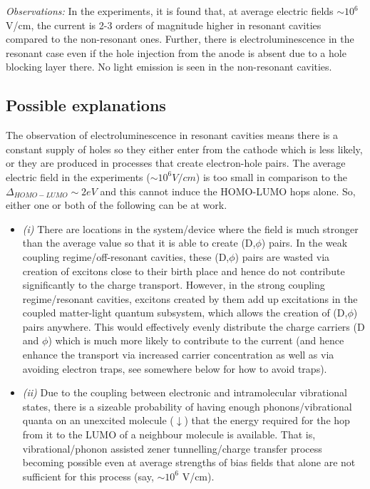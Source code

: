 \documentclass[a4paper,twocolumn]{revtex4-1} %
\newcommand{\da}{\downarrow}
\begin{document}
{\it Observations:}
In the experiments, it is found that, at average electric fields $\sim 10^6$V/cm, the current is 2-3 orders of magnitude higher in resonant cavities compared to the non-resonant ones. Further, there is electroluminescence in the resonant case even if the hole injection from the anode is absent due to a hole blocking layer there. No light emission is seen in the non-resonant cavities.

\subsection{Possible explanations}
\label{subsec:zener}
The observation of electroluminescence in resonant cavities means there is a constant supply of holes so they either enter from the cathode which is less likely, or they are produced in processes that create electron-hole pairs.
The average electric field in the experiments ($\sim 10^6 V/cm$) 
is too small in comparison to the 
$\Delta_{HOMO-LUMO}\sim 2eV$
 and this cannot induce the HOMO-LUMO hops alone.
 So, either one or both of the following can be at work.
 
 \begin{itemize}
 
 \item {\it(i)} 
 There are locations in the system/device 
 where the field is much stronger than the average value so that it is able to create (D,$\phi$) 
 pairs.
In the weak coupling regime/off-resonant cavities,
these (D,$\phi$) pairs are wasted via creation of excitons
close to their birth place and hence do not contribute significantly to the charge transport.
However, in the strong coupling regime/resonant cavities,
excitons created by them add up excitations in the coupled 
matter-light quantum subsystem, which allows the creation
of (D,$\phi$) pairs anywhere.
This would effectively evenly distribute the charge carriers (D and $\phi$) which is much more likely to contribute to the current (and hence enhance the transport via increased carrier concentration as well as via avoiding electron traps, see somewhere below for how to avoid traps).
 
\item {\it(ii)} 
Due to the coupling between electronic and intramolecular 
 vibrational states, there is a sizeable probability of having enough 
 phonons/vibrational quanta 
 on an unexcited molecule ($\da$)
 that %
 the energy required for the hop from it to the LUMO of a neighbour molecule is available. That is, vibrational/phonon assisted zener tunnelling/charge transfer process becoming possible even at average strengths of bias fields that alone are not sufficient for this process (say, $\sim10^6$ V/cm). 

\end{itemize}
\end{document}
